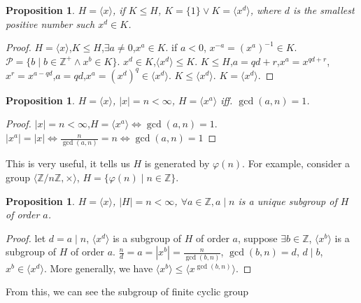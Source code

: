 \documentclass[10pt,a4paper]{article}
\newtheorem{proposition}[theorem]{Proposition}
\theoremstyle{definition}
\begin{document}
\begin{proposition}
    $H=\langle x\rangle$, if $K\le H$, $K=\{1\}\lor K=\langle x^d\rangle$, where $d$ is the smallest positive number such $x^d\in K$.
\end{proposition}
\begin{proof}
    $H=\langle x\rangle$,$K\le H$,$\exists a\ne0$,$x^a\in K$. if $a<0$, $x^{-a}=(x^{a})^{-1}\in K$.
    $\mathcal{P}=\{b\mid b\in\mathbb{Z}^+\land x^b\in K\}$. $x^d\in K$,$\langle x^d\rangle\le K$. 
    $K\le H$,$a=qd+r$,$x^a=x^{qd+r}$,$x^r=x^{a-qd}$,$a=qd$,$x^a=(x^{d})^q\in\langle x^d\rangle$. $K\le\langle x^d\rangle$. $K=\langle x^d\rangle$.
\end{proof}
\begin{proposition}
    $H=\langle x\rangle$, $|x|=n<\infty$, $H=\langle x^a\rangle$ iff. $\gcd(a,n)=1$.
\end{proposition}
\begin{proof}
    $|x|=n<\infty$,$H=\langle x^a\rangle\iff\gcd(a,n)=1$.
    $|x^a|=|x|\iff\frac{n}{\gcd(a,n)}=n\iff\gcd(a,n)=1$
\end{proof}
This is very useful, it tells us $H$ is generated by $\varphi(n)$. For example, consider a group $\langle\mathbb{Z}/n\mathbb{Z},\times\rangle$, $H=\{\varphi(n)\mid n\in\mathbb{Z}\}$.
\begin{proposition}
    $H=\langle x\rangle$, $|H|=n<\infty$, $\forall a\in\mathbb{Z},a\mid n$ is a unique subgroup of $H$ of order $a$.
\end{proposition}
\begin{proof}
    let $d=a\mid n$, $\langle x^d\rangle$ is a subgroup of $H$ of order $a$, suppose $\exists b\in\mathbb{Z}$, $\langle x^b\rangle$ is a subgroup of $H$ of order $a$.
    $\frac{n}{d}=a=|x^b|=\frac{n}{\gcd(b,n)}$, $\gcd(b,n)=d$, $d\mid b$, $x^b\in\langle x^d\rangle$. More generally, we have $\langle x^b\rangle\le\langle x^{\gcd(b,n)}\rangle$.
\end{proof}
From this, we can see the subgroup of finite cyclic group 
\end{document}
